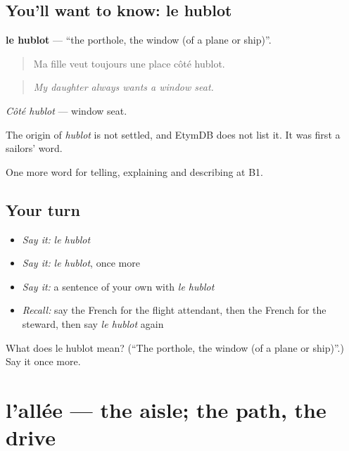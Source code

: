\subsection*{You'll want to know: le hublot}
\textbf{le hublot} — \textquotedblleft{}the porthole, the window (of a plane or ship)\textquotedblright{}.

\begin{quote}
Ma fille veut toujours une place côté hublot.
\end{quote}

\begin{quote}
\emph{My daughter always wants a window seat.}
\end{quote}

\emph{Côté hublot} — window seat.

\begin{cousinweb}
The origin of \emph{hublot} is not settled, and EtymDB does not list it. It was first a sailors' word.
\end{cousinweb}

\begin{grammarlens}[title={What you've built}]
One more word for telling, explaining and describing at B1.
\end{grammarlens}

\subsection*{Your turn}
\begin{itemize}
\raggedright
  \item \emph{Say it:} \emph{le hublot}
  \item \emph{Say it:} \emph{le hublot}, once more
  \item \emph{Say it:} a sentence of your own with \emph{le hublot}
  \item \emph{Recall:} say the French for the flight attendant, then the French for the steward, then say \emph{le hublot} again
\end{itemize}

\begin{tcolorbox}[breakable,colback=teal!4,colframe=teal!35!black,title={Before you move on}]
What does le hublot mean? (\textquotedblleft{}The porthole, the window (of a plane or ship)\textquotedblright{}.) Say it once more.
\end{tcolorbox}
\section[l'allée]{l'allée — the aisle; the path, the drive}

